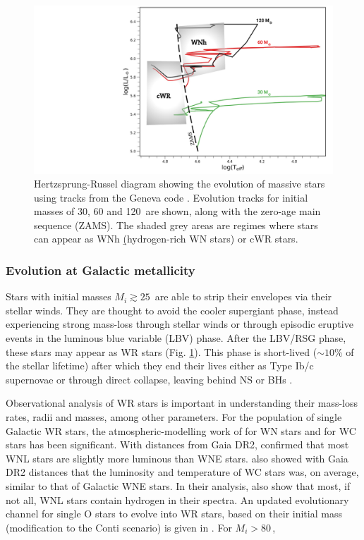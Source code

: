 \begin{figure}
    \centering
    \includegraphics[width=\hsize]{chapters/introduction/image/HRD_GENEVA.pdf}
    \caption{Hertzsprung-Russel diagram showing the evolution of massive stars using tracks from the Geneva code \citep{2012Ekstrom}. Evolution tracks for initial masses of 30, 60 and 120\,\Msun{} are shown, along with the zero-age main sequence (ZAMS). The shaded grey areas are regimes where stars can appear as WNh \b{(hydrogen-rich WN stars)} or cWR stars.}
    \label{fig:hrd_geneva}
\end{figure}

\subsubsection{Evolution at Galactic metallicity} \label{sect:evo_galactic}

Stars with initial masses $M_i \gtrsim 25\,$\Msun{} are able to strip their envelopes via their stellar winds. They are thought to avoid the cooler supergiant phase, instead experiencing strong mass-loss through stellar winds or through episodic eruptive events in the luminous blue variable (LBV) phase. After the LBV/RSG phase, these stars may appear as WR stars (Fig. \ref{fig:hrd_geneva}). This phase is short-lived (${\sim}10$\% of the stellar lifetime) after which they end their lives either as Type Ib/c supernovae or through direct collapse, leaving behind NS or BHs \citep{heger_how_2003}.

Observational analysis of WR stars is important in understanding their mass-loss rates, radii and masses, among other parameters. For the population of single Galactic WR stars, the atmospheric-modelling work of \citet{hamann_galactic_2019} for WN stars and \citet{sander_galactic_2019} for WC stars has been significant. With distances from Gaia DR2, \citet{hamann_galactic_2019} confirmed that most WNL stars are slightly more luminous than WNE stars. \citet{sander_galactic_2019} also showed with Gaia DR2 distances that the luminosity and temperature of WC stars was, on average, similar to that of Galactic WNE stars. In their analysis, \citet{hamann_galactic_2019} also show that most, if not all, WNL stars contain hydrogen in their spectra. An updated evolutionary channel for single O stars to evolve into WR stars, based on their initial mass (modification to the Conti scenario) is given in \citet{sander_galactic_2019}. For $M_i > 80\,$\Msun{},

